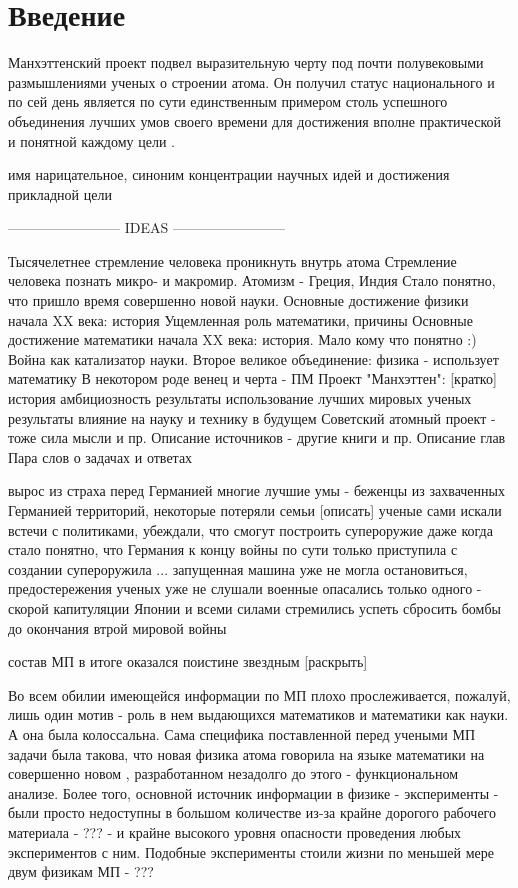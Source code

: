 \chapter*{Введение}

Манхэттенский проект подвел выразительную черту под почти полувековыми размышлениями ученых о строении атома.
Он получил статус национального и по сей день является по сути единственным примером столь успешного объединения лучших умов своего времени для достижения вполне практической и понятной каждому цели \cite{bib_mathphylhist}.

имя нарицательное, синоним концентрации научных идей и достижения прикладной цели



------------------------ IDEAS ------------------------ 

Тысячелетнее стремление человека проникнуть внутрь атома
Стремление человека познать микро- и макромир. Атомизм - Греция, Индия
Стало понятно, что пришло время совершенно новой науки.
Основные достижение физики начала XX века: история
Ущемленная роль математики, причины 
Основные достижение математики начала XX века: история. Мало кому что понятно :)
Война как катализатор науки.
Второе великое объединение: физика - использует математику
В некотором роде венец и черта - ПМ
Проект "Манхэттен": [кратко]
    история
    амбициозность
    результаты
    использование лучших мировых ученых
    результаты
    влияние на науку и технику в будущем
Советский атомный проект - тоже сила мысли и пр.
Описание источников - другие книги и пр.
Описание глав
Пара слов о задачах и ответах



вырос из страха перед Германией
многие лучшие умы - беженцы из захваченных Германией территорий, некоторые потеряли семьи [описать]
ученые сами искали встечи с политиками, убеждали, что смогут построить супероружие
даже когда стало понятно, что Германия к концу войны по сути только приступила с создании супероружила ...  запущенная машина уже не могла остановиться, предостережения ученых уже не слушали
военные опасались только  одного - скорой капитуляции Японии и всеми силами стремились успеть сбросить бомбы до окончания втрой мировой войны

состав МП в итоге оказался поистине звездным [раскрыть]

Во всем обилии имеющейся информации по МП плохо прослеживается, пожалуй, лишь один мотив - роль в нем выдающихся математиков и математики как науки.
А она была колоссальна.
Сама специфика поставленной перед учеными МП задачи была такова, что новая физика атома говорила на языке математики на совершенно новом , разработанном незадолго до этого - функциональном анализе.
Более того, основной источник информации в физике - эксперименты - были просто недоступны в большом количестве из-за крайне дорогого рабочего материала - ??? - 
и крайне высокого уровня опасности проведения любых экспериментов с ним. Подобные эксперименты стоили жизни по меньшей мере двум физикам МП - ???

